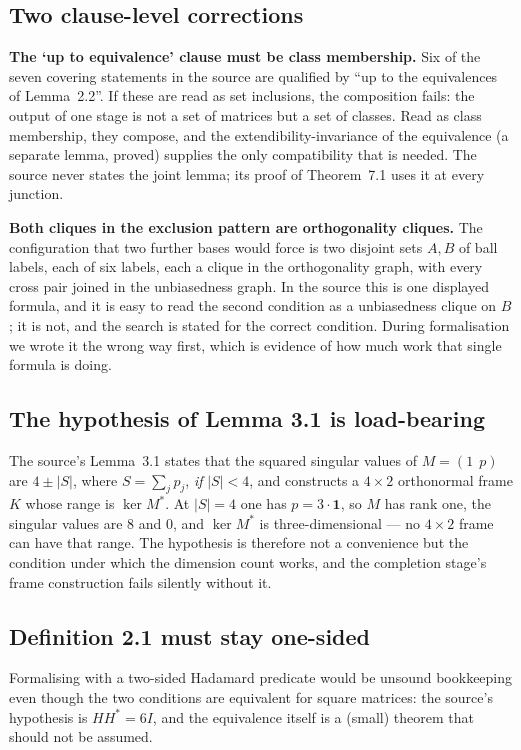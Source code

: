 \documentclass[11pt]{article}
\theoremstyle{definition}
\newcommand{\abs}[1]{\lvert #1\rvert}
\begin{document}
\subsection{Two clause-level corrections}

\textbf{The `up to equivalence' clause must be class membership.} Six of the seven covering
statements in the source are qualified by ``up to the equivalences of Lemma~2.2''. If these are read
as set inclusions, the composition fails: the output of one stage is not a set of matrices but a set
of classes. Read as class membership, they compose, and the extendibility-invariance of the
equivalence (a separate lemma, proved) supplies the only compatibility that is needed. The source
never states the joint lemma; its proof of Theorem~7.1 uses it at every junction.

\textbf{Both cliques in the exclusion pattern are orthogonality cliques.} The configuration that
two further bases would force is two disjoint sets $A,B$ of ball labels, each of six labels, each a
clique in the orthogonality graph, with every cross pair joined in the unbiasedness graph. In the
source this is one displayed formula, and it is easy to read the second condition as a
unbiasedness clique on $B$; it is not, and the search is stated for the correct condition. During
formalisation we wrote it the wrong way first, which is evidence of how much work that single
formula is doing.

\subsection{The hypothesis of Lemma 3.1 is load-bearing}

The source's Lemma~3.1 states that the squared singular values of $M=(1\ \ p)$ are $4\pm\abs S$,
where $S=\sum_j p_j$, \emph{if} $\abs S<4$, and constructs a $4\times2$ orthonormal frame $K$ whose
range is $\ker M^*$. At $\abs S=4$ one has $p=3\cdot\mathbf 1$, so $M$ has rank one, the singular
values are $8$ and $0$, and $\ker M^*$ is three-dimensional --- no $4\times 2$ frame can have that
range. The hypothesis is therefore not a convenience but the condition under which the dimension
count works, and the completion stage's frame construction fails silently without it.

\subsection{Definition 2.1 must stay one-sided}
Formalising with a two-sided Hadamard predicate would be unsound bookkeeping even though the two
conditions are equivalent for square matrices: the source's hypothesis is $HH^*=6I$, and the
equivalence itself is a (small) theorem that should not be assumed.
\end{document}
